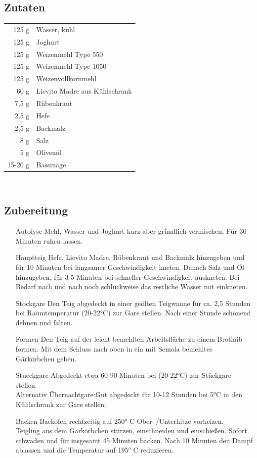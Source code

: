 \subsection*{Zutaten}
\begin{tabular}{r l}
      125 g & Wasser, kühl                  \\
      125 g & Joghurt                       \\
      125 g & Weizenmehl Type 550           \\
      125 g & Weizenmehl Type 1050          \\
      125 g & Weizenvollkornmehl            \\
       60 g & Lievito Madre aus Kühlschrank \\
      7,5 g & Rübenkraut                    \\
      2,5 g & Hefe                          \\
      2,5 g & Backmalz                      \\
        8 g & Salz                          \\
        5 g & Olivenöl                      \\
    15-20 g & Bassinage
\end{tabular}\\

\subsection*{Zubereitung}
\begin{enumerate}
    \item [\Gls{Autolyse}] Mehl, Wasser und Joghurt kurz aber gründlich vermischen. Für 30 Minuten ruhen lassen.
    \item [\Gls{Hauptteig}] Hefe, Lievito Madre, Rübenkraut und Backmalz hinzugeben und für 10 Minuten bei langsamer Geschwindigkeit kneten. Danach Salz und Öl hinzugeben, für 3-5 Minuten bei schneller Geschwindigkeit auskneten. Bei Bedarf nach und nach noch schluckweise das restliche Wasser mit einkneten.
    \item [\Gls{Stockgare}] Den Teig abgedeckt in einer geölten  Teigwanne für ca. 2,5 Stunden bei Raumtemperatur (20-22°C) zur Gare stellen. Nach einer Stunde schonend dehnen und falten.
    \item [\Gls{Formen}] Den Teig auf der leicht bemehlten Arbeitsfläche zu einem Brotlaib formen. Mit dem Schluss nach oben in ein mit Semola bemehltes Gärkörbchen geben.
    \item [\Gls{Stueckgare}]  Abgedeckt etwa 60-90 Minuten bei (20-22°C) zur Stückgare stellen.\\
    Alternativ Übernachtgare:Gut abgedeckt für 10-12 Stunden bei 5°C in den Kühlschrank zur Gare stellen.
    \item [\Gls{Backen}] Backofen rechtzeitig auf 250° C Ober–/Unterhitze vorheizen.\\
    Teigling aus dem Gärkörbchen stürzen, einschneiden  und einschießen. Sofort schwaden und für insgesamt 45 Minuten backen. Nach 10 Minuten den Dampf ablassen und die Temperatur auf 195° C reduzieren.
\end{enumerate}


